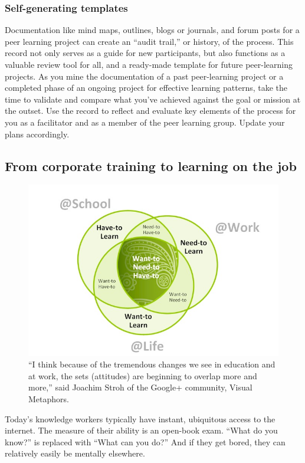 \subsubsection{Self-generating templates}

Documentation like mind maps, outlines, blogs or journals, and forum
posts for a peer learning project can create an ``audit trail,'' or
history, of the process. This record not only serves as a guide for new
participants, but also functions as a valuable review tool for all, and
a ready-made template for future peer-learning projects. As you mine the
documentation of a past peer-learning project or a completed phase of an
ongoing project for effective learning patterns, take the time to
validate and compare what you've achieved against the goal or mission at
the outset. Use the record to reflect and evaluate key elements of the
process for you as a facilitator and as a member of the peer learning
group. Update your plans accordingly.

\subsection{From corporate training to learning on the job}

\begin{figure}
\begin{center}
\includegraphics[width=.75\textwidth]{../pictures/learn.jpg}
\caption*{``I think because of the
tremendous changes we see in education and at work, the sets
(attitudes) are beginning to overlap more and more,'' said Joachim
Stroh of the Google+ community, Visual Metaphors.}
\end{center}
\end{figure}

Today's knowledge workers typically have instant, ubiquitous access to
the internet. The measure of their ability is an open-book exam. ``What
do you know?'' is replaced with ``What can you do?'' And if they get
bored, they can relatively easily be mentally elsewhere.

